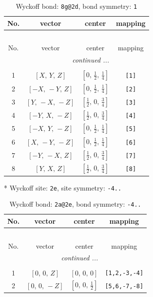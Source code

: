 \documentclass[fleqn,8pt]{jsarticle}
\begin{document}
\renewcommand{\arraystretch}{1.2}
\begin{longtable}{cccc}
\caption{Wyckoff bond: {\tt 8g@2d}, bond symmetry: {\tt 1}}
 \\
 \hline \hline
No. & vector & center & mapping \\ \hline \endfirsthead

\multicolumn{3}{l}{\tablename\ \thetable{}} \\
 \hline \hline
No. & vector & center & mapping \\ \hline \endhead

 \hline \hline
\multicolumn{3}{r}{\footnotesize\it continued ...} \\ \endfoot

 \hline \hline
\multicolumn{3}{r}{} \\ \endlastfoot

1 & $\left[ X,\, Y,\, Z \right]$ & $\left[ 0,\, \frac{1}{2},\, \frac{1}{4} \right]$ & {\tt [1]} \\ \hline
2 & $\left[ - X,\, - Y,\, Z \right]$ & $\left[ 0,\, \frac{1}{2},\, \frac{1}{4} \right]$ & {\tt [2]} \\ \hline
3 & $\left[ Y,\, - X,\, - Z \right]$ & $\left[ \frac{1}{2},\, 0,\, \frac{3}{4} \right]$ & {\tt [3]} \\ \hline
4 & $\left[ - Y,\, X,\, - Z \right]$ & $\left[ \frac{1}{2},\, 0,\, \frac{3}{4} \right]$ & {\tt [4]} \\ \hline
5 & $\left[ - X,\, Y,\, - Z \right]$ & $\left[ 0,\, \frac{1}{2},\, \frac{1}{4} \right]$ & {\tt [5]} \\ \hline
6 & $\left[ X,\, - Y,\, - Z \right]$ & $\left[ 0,\, \frac{1}{2},\, \frac{1}{4} \right]$ & {\tt [6]} \\ \hline
7 & $\left[ - Y,\, - X,\, Z \right]$ & $\left[ \frac{1}{2},\, 0,\, \frac{3}{4} \right]$ & {\tt [7]} \\ \hline
8 & $\left[ Y,\, X,\, Z \right]$ & $\left[ \frac{1}{2},\, 0,\, \frac{3}{4} \right]$ & {\tt [8]} \\
\end{longtable}
* Wyckoff site: {\tt 2e}, site symmetry: {\tt -4..}
\renewcommand{\arraystretch}{1.2}
\begin{longtable}{cccc}
\caption{Wyckoff bond: {\tt 2a@2e}, bond symmetry: {\tt -4..}}
 \\
 \hline \hline
No. & vector & center & mapping \\ \hline \endfirsthead

\multicolumn{3}{l}{\tablename\ \thetable{}} \\
 \hline \hline
No. & vector & center & mapping \\ \hline \endhead

 \hline \hline
\multicolumn{3}{r}{\footnotesize\it continued ...} \\ \endfoot

 \hline \hline
\multicolumn{3}{r}{} \\ \endlastfoot

1 & $\left[ 0,\, 0,\, Z \right]$ & $\left[ 0,\, 0,\, 0 \right]$ & {\tt [1,2,-3,-4]} \\ \hline
2 & $\left[ 0,\, 0,\, - Z \right]$ & $\left[ 0,\, 0,\, \frac{1}{2} \right]$ & {\tt [5,6,-7,-8]} \\
\end{longtable}
\end{document}
